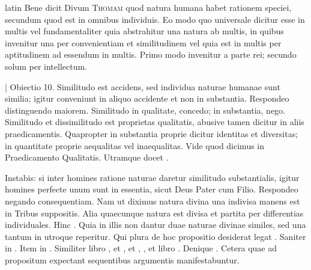 \begin{otherlanguage*}{latin}
\pstart
Bene dicit Divum \textsc{Thomam} quod natura humana habet rationem  speciei, secundum quod est in omnibus individuis. Eo modo quo universale dicitur esse in multis vel fundamentaliter quia abstrahitur una natura ab multis, in quibus invenitur una per convenientiam et similitudinem vel quia est in multis per aptitudinem ad essendum in multis. Primo modo invenitur a parte rei; secundo solum per intellectum. 
\pend

\pstart
\textnormal{|} Obiectio 10. Similitudo est accidens, sed individua naturae humanae sunt similia; igitur conveniunt in aliquo accidente et non in substantia. Respondeo distinguendo maiorem. Similitudo in qualitate, concedo; in substantia, nego. Similitudo et dissimilitudo est proprietas qualitatis, abusive tamen dicitur in aliis praedicamentis. Quapropter in substantia proprie dicitur identitas et diversitas; in quantitate proprie aequalitas vel inaequalitas. Vide quod dicimus in Praedicamento Qualitatis. Utramque docet . 
\pend

\pstart
Instabis:
si inter homines ratione naturae daretur similitudo substantialis, igitur homines perfecte unum sunt in essentia, sicut Deus Pater cum Filio. Respondeo negando consequentiam. Nam ut diximus natura divina una indivisa manens est in Tribus suppositis. Alia quaecunque natura est divisa et partita per differentias individuales. Hinc . Quia in illis non dantur duae naturae divinae similes, sed una tantum in utroque reperitur. Qui plura de hoc propositio desiderat legat . Saniter in . Item in . Similiter libro , et , et , , et libro . Denique . Cetera quae ad propositum expectant sequentibus argumentis manifestabuntur. 
\pend


\end{otherlanguage*}
